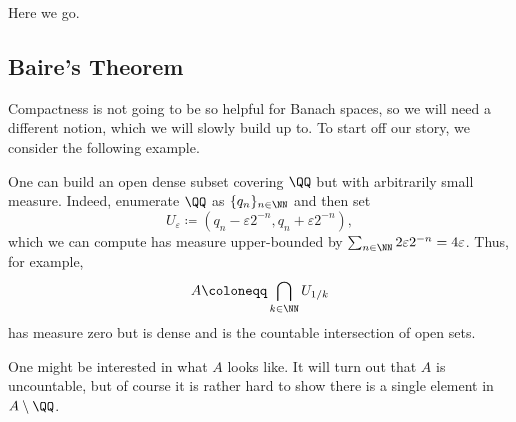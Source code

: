 \documentclass[../notes.tex]{subfiles}
\begin{document}
Here we go.

\subsection{Baire's Theorem}
Compactness is not going to be so helpful for Banach spaces, so we will need a different notion, which we will slowly build up to. To start off our story, we consider the following example.
\begin{example} \label{ex:open-dense}
	One can build an open dense subset covering $\QQ$ but with arbitrarily small measure. Indeed, enumerate $\QQ$ as $\{q_n\}_{n\in\NN}$ and then set
	\[U_\varepsilon\coloneqq\left(q_n-\varepsilon2^{-n},q_n+\varepsilon2^{-n}\right),\]
	which we can compute has measure upper-bounded by $\sum_{n\in\NN}2\varepsilon2^{-n}=4\varepsilon$. Thus, for example,
	\[A\coloneqq\bigcap_{k\in\NN}U_{1/k}\]
	has measure zero but is dense and is the countable intersection of open sets.
\end{example}
One might be interested in what $A$ looks like. It will turn out that $A$ is uncountable, but of course it is rather hard to show there is a single element in $A\setminus\QQ$.
\end{document}
